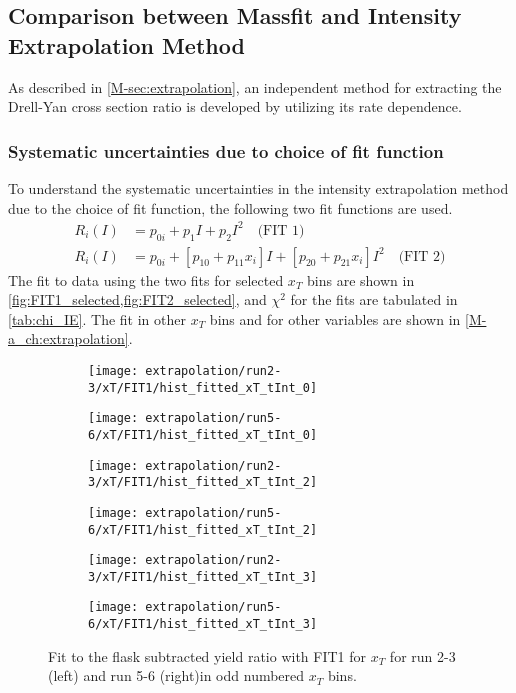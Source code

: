 \documentclass[../main.tex]{subfiles}
\begin{document}
\subsection{Comparison between Massfit and Intensity Extrapolation Method}
As described in \cref{M-sec:extrapolation}, an independent method for extracting the Drell-Yan cross section
ratio is developed by utilizing its rate dependence.

\subsubsection{Systematic uncertainties due to choice of fit function}
To understand the systematic uncertainties in the intensity extrapolation method due to the
choice of fit function, the following two fit functions are used.
\begin{align}
	R_i\left(I\right) & = p_{0i} + p_{1} I + p_{2} I^2 \quad\text{(FIT 1)}                                                     \\
	R_i\left(I\right) & = p_{0i} + \left[p_{10} + p_{11}x_i\right] I + \left[p_{20} + p_{21}x_i\right]I^2 \quad \text{(FIT 2)}
	\label{eq:fit_functions}
\end{align}
The fit to data using the two fits for selected $x_T$ bins are shown in \cref{fig:FIT1_selected,fig:FIT2_selected},
and $\chi^2$ for the fits are tabulated in \cref{tab:chi_IE}.
The fit in other $x_T$ bins and for other variables are shown in \cref{M-a_ch:extrapolation}.
%
%
\begin{figure}[h!]
	\centering
	\begin{subfigure}{0.45\linewidth}
		\texttt{[image: extrapolation/run2-3/xT/FIT1/hist\_fitted\_xT\_tInt\_0]}
	\end{subfigure}
	\begin{subfigure}{0.45\linewidth}
		\texttt{[image: extrapolation/run5-6/xT/FIT1/hist\_fitted\_xT\_tInt\_0]}
	\end{subfigure}
	\begin{subfigure}{0.45\linewidth}
		\texttt{[image: extrapolation/run2-3/xT/FIT1/hist\_fitted\_xT\_tInt\_2]}
	\end{subfigure}
	\begin{subfigure}{0.45\linewidth}
		\texttt{[image: extrapolation/run5-6/xT/FIT1/hist\_fitted\_xT\_tInt\_2]}
	\end{subfigure}
	\begin{subfigure}{0.45\linewidth}
		\texttt{[image: extrapolation/run2-3/xT/FIT1/hist\_fitted\_xT\_tInt\_3]}
	\end{subfigure}
	\begin{subfigure}{0.45\linewidth}
		\texttt{[image: extrapolation/run5-6/xT/FIT1/hist\_fitted\_xT\_tInt\_3]}
	\end{subfigure}
	\caption{Fit to the flask subtracted yield ratio with FIT1 for $x_T$ for run 2-3 (left) and run 5-6 (right)in odd numbered $x_T$ bins.}
	\label{fig:FIT1_selected}
\end{figure}
\end{document}
